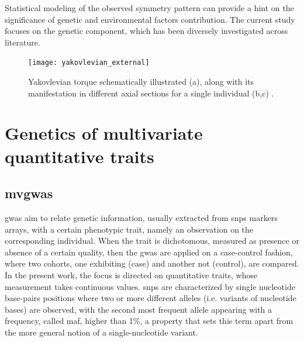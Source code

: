 Statistical modeling of the observed symmetry pattern can provide a hint on the significance  of genetic and environmental factors contribution\cite{Klingenberg2020}. The current study focuses on the genetic component, which has been diversely investigated across literature.


\begin{figure}
	\centering
%		
\centering
\texttt{[image: yakovlevian\_external]}
\caption[Yakovlevian Torque \cite{Kuo2022}]{Yakovlevian torque schematically illustrated (a), along with its manifestation in different axial sections for a single individual (b,c) \cite{Kuo2022}.}
\label{fig:yaktorque}
\end{figure}



\section{Genetics of multivariate quantitative traits}

\subsection{\Acf{mvgwas}}
\ac{gwas} aim to relate genetic information, usually extracted from \acfp{snp} markers arrays, with a certain phenotypic trait, namely an observation on the corresponding individual. When the trait is dichotomous, measured as presence or absence of a certain quality, then the \ac{gwas} are applied on a case-control fashion, where two cohorts, one exhibiting (case) and another not (control), are compared. \cite{Uffelmann2021} In the present work, the focus is directed on quantitative traits, whose measurement takes continuous values. \acfp{snp} are characterized by single nucleotide base-pairs positions where two or more different alleles (i.e. variants of nucleotide bases) are observed, with the second most frequent allele appearing with a frequency, called \ac{maf}, higher than 1\%, a property that sets this term apart from the more general notion of a single-nucleotide variant. 

